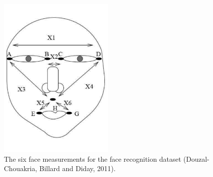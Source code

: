 \documentclass[article]{jss}
\begin{document}
\begin{appendix}
\begin{figure}[t!]
\centering
\includegraphics[width=0.5\textwidth]{pic/face}
\caption{\label{fig:face} The six face measurements for the face recognition dataset 
(Douzal-Chouakria, Billard and Diday, 2011).}
\end{figure}




\end{appendix}
\end{document}
